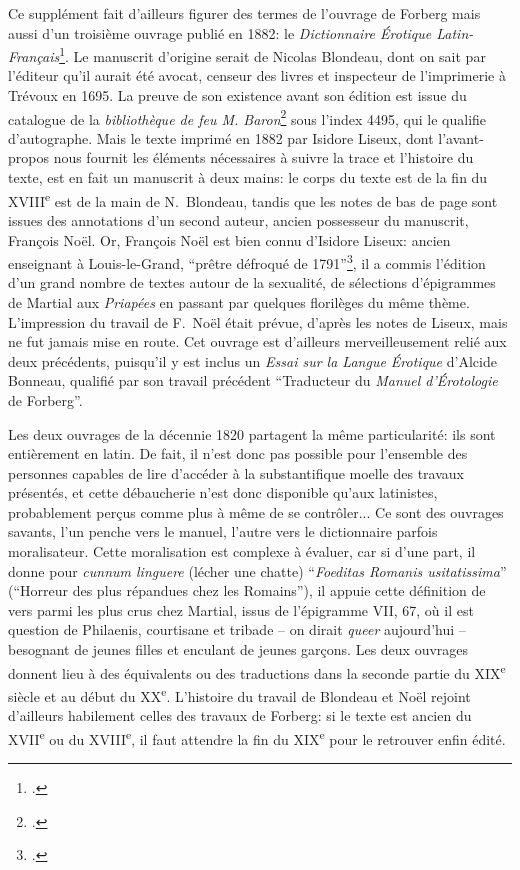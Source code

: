 Ce supplément fait d'ailleurs figurer des termes de l'ouvrage de Forberg mais aussi d'un troisième ouvrage publié en 1882: le \textit{Dictionnaire Érotique Latin-Français}\footcite{blondeau_dictionnaire_1885}. Le manuscrit d'origine serait de Nicolas Blondeau, dont on sait par l'éditeur qu'il aurait été avocat, censeur des livres et inspecteur de l'imprimerie à Trévoux en 1695. La preuve de son existence avant son édition est issue du catalogue de la \textit{bibliothèque de feu M. Baron}\footcite[Chap. \textit{Belles-Lettres}, p~.2]{noauthor_catalogue_1788} sous l'index 4495, qui le qualifie d'autographe. Mais le texte imprimé en 1882 par Isidore Liseux, dont l'avant-propos nous fournit les éléments nécessaires à suivre la trace et l'histoire du texte, est en fait un manuscrit à deux mains: le corps du texte est de la fin du XVIII\textsuperscript{e} est de la main de N.~Blondeau, tandis que les notes de bas de page sont issues des annotations d'un second auteur, ancien possesseur du manuscrit, François Noël. Or, François Noël est bien connu d'Isidore Liseux: ancien enseignant à Louis-le-Grand, \enquote{prêtre défroqué de 1791}\footcite[p.~XVI]{blondeau_dictionnaire_1885}, il a commis l'édition d'un grand nombre de textes autour de la sexualité, de sélections d'épigrammes de Martial aux \textit{Priapées} en passant par quelques florilèges du même thème. L'impression du travail de F.~Noël était prévue, d'après les notes de Liseux, mais ne fut jamais mise en route. Cet ouvrage est d'ailleurs merveilleusement relié aux deux précédents, puisqu'il y est inclus un \textit{Essai sur la Langue Érotique} d'Alcide Bonneau, qualifié par son travail précédent \enquote{Traducteur du \textit{Manuel d'Érotologie} de Forberg}.


Les deux ouvrages de la décennie 1820 partagent la même particularité: ils sont entièrement en latin. De fait, il n'est donc pas possible pour l'ensemble des personnes capables de lire d'accéder à la substantifique moelle des travaux présentés, et cette débaucherie n'est donc disponible qu'aux latinistes, probablement perçus comme plus à même de se contrôler... Ce sont des ouvrages savants, l'un penche vers le manuel, l'autre vers le dictionnaire parfois moralisateur. Cette moralisation est complexe à évaluer, car si d'une part, il donne pour \textit{cunnum linguere} (lécher une chatte) \enquote{\textit{Foeditas Romanis usitatissima}} (\enquote{Horreur des plus répandues chez les Romains}), il appuie cette définition de vers parmi les plus crus chez Martial, issus de l'épigramme VII, 67, où il est question de Philaenis, courtisane et tribade -- on dirait \textit{queer} aujourd'hui -- besognant de jeunes filles et enculant de jeunes garçons. Les deux ouvrages donnent lieu à des équivalents ou des traductions dans la seconde partie du XIX\textsuperscript{e} siècle et au début du XX\textsuperscript{e}. L'histoire du travail de Blondeau et Noël rejoint d'ailleurs habilement celles des travaux de Forberg: si le texte est ancien du XVII\textsuperscript{e} ou du XVIII\textsuperscript{e}, il faut attendre la fin du XIX\textsuperscript{e} pour le retrouver enfin édité.

